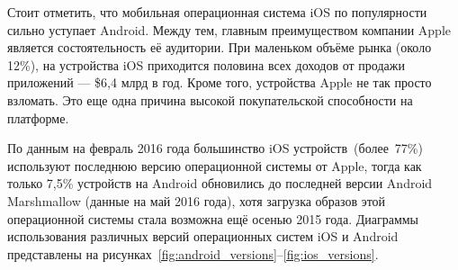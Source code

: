 Стоит отметить, что мобильная операционная система iOS по популярности
сильно уступает Android.
Между тем, главным преимуществом компании Apple является
состоятельность её аудитории. При маленьком объёме рынка (около 12\%),
на устройства iOS приходится половина всех доходов
от продажи приложений --- \$6,4 млрд в год.
Кроме того, устройства Apple не так просто взломать.
Это еще одна причина высокой покупательской способности на платформе.

По данным на февраль 2016 года большинство iOS устройств~(более~77\%) используют
последнюю версию операционной системы от Apple, тогда как только 7,5\%
устройств на Android обновились до последней версии Android Marshmallow (данные
на май 2016 года), хотя загрузка образов этой операционной системы стала
возможна ещё осенью 2015 года.
Диаграммы использования различных версий операционных систем iOS и Android
представлены на рисунках~\ref{fig:android_versions}--\ref{fig:ios_versions}.

